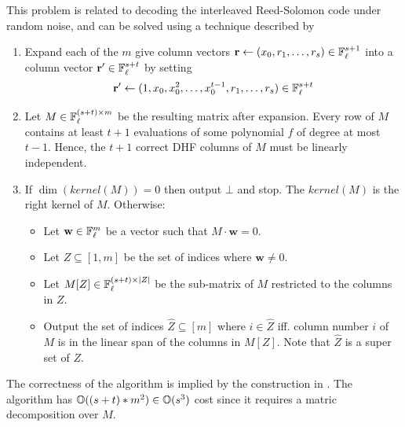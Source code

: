 %
This problem is related to decoding the interleaved Reed-Solomon code under random noise, and can be solved using a technique described by \citet{coppersmith2003reconstructing} 

\begin{enumerate}
    \item Expand each of the $m$ give column vectors $\mathbf{r} \gets (x_0, r_1, \dots, r_s) \in \mathbb{F}^{s+1}_{\ell}$ into a column vector $\mathbf{r'} \in \mathbb{F}^{s+t}_{\ell}$ by setting $$\mathbf{r'} \gets (1, x_0, x_0^2, \dots, x_0^{t-1}, r_1, \dots, r_s) \in \mathbb{F}^{s+t}_{\ell}$$
    
    \item Let $M \in \mathbb{F}^{(s+t) \times m}_\ell$ be the resulting matrix after expansion. Every row of $M$ contains at least $t+1$ evaluations of some polynomial $f$ of degree at most $t-1$.
	Hence, the $t+1$ correct DHF columns of $M$ must be linearly independent.
    \item If $\dim(kernel(M)) = 0$ then output  $\bot$ and stop. The $kernel(M)$ is the right kernel of $M$. Otherwise:
    
    \begin{itemize}
        \item Let $\mathbf{w} \in \mathbb{F}^{m}_{\ell}$ be a vector such that $M \cdot \mathbf{w} = 0$.
        \item Let $Z \subseteq [1,m]$ be the set of indices where $\mathbf{w} \neq 0$.
        \item Let $M[Z] \in \mathbb{F}_{\ell}^{(s+t) \times |Z|}$ be the sub-matrix of $M$ restricted to the columns in $Z$.
        \item Output the set of indices $\hat{Z} \subseteq [m]$ where $i \in \hat{Z}$ iff. column number $i$ of $M$ is in the linear span of the columns in $M[Z]$. Note that $\hat{Z}$ is a super set of $Z$.
    \end{itemize}
\end{enumerate}

The correctness of the algorithm is implied by the construction in \cite{coppersmith2003reconstructing}. The algorithm has $\mathbb{O}((s+t) * m^2) \in \mathbb{O}(s^3)$ cost since it requires a matric decomposition over $M$. 

